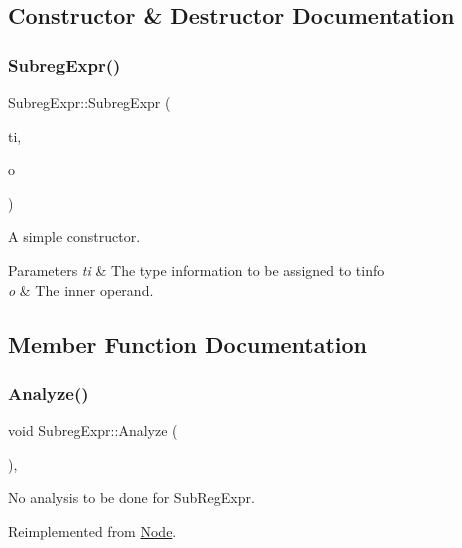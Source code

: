 \subsection{Constructor \& Destructor Documentation}
\mbox{\label{class_subreg_expr_a5ff067d8a0a8e7d8482a88903389e5b0}} 
\subsubsection{\texorpdfstring{Subreg\+Expr()}{SubregExpr()}}
{\footnotesize\ttfamily Subreg\+Expr\+::\+Subreg\+Expr (\begin{DoxyParamCaption}\item[{\hyperlink{class_type_info}{Type\+Info} $\ast$}]{ti,  }\item[{\hyperlink{class_operand}{Operand} $\ast$}]{o }\end{DoxyParamCaption})}

A simple constructor. 
\begin{DoxyParams}{Parameters}
{\em ti} & The type information to be assigned to tinfo \\
\hline
{\em o} & The inner operand. \\
\hline
\end{DoxyParams}


\subsection{Member Function Documentation}
\mbox{\label{class_subreg_expr_acc9be43aae902cf0727ba6b7ab8d85b1}} 
\subsubsection{\texorpdfstring{Analyze()}{Analyze()}}
{\footnotesize\ttfamily void Subreg\+Expr\+::\+Analyze (\begin{DoxyParamCaption}{ }\end{DoxyParamCaption})\hspace{0.3cm}{\ttfamily [inline]}, {\ttfamily [virtual]}}

No analysis to be done for Sub\+Reg\+Expr. 

Reimplemented from \hyperlink{class_node_a5f88d55c6f253a29def7ccc443d83d47}{Node}.

